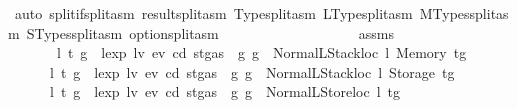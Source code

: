 \begin{isabellebody}
\ {\isacharparenleft}{\kern0pt}auto\ split{\isacharcolon}{\kern0pt}if{\isacharunderscore}{\kern0pt}split{\isacharunderscore}{\kern0pt}asm\ result{\isachardot}{\kern0pt}split{\isacharunderscore}{\kern0pt}asm\ Type{\isachardot}{\kern0pt}split{\isacharunderscore}{\kern0pt}asm\ LType{\isachardot}{\kern0pt}split{\isacharunderscore}{\kern0pt}asm\ MTypes{\isachardot}{\kern0pt}split{\isacharunderscore}{\kern0pt}asm\ STypes{\isachardot}{\kern0pt}split{\isacharunderscore}{\kern0pt}asm\ option{\isachardot}{\kern0pt}split{\isacharunderscore}{\kern0pt}asm{\isacharparenright}{\kern0pt}\isanewline
\ \ \ \ \isamarkupfalse%
\isanewline
\ \ \isamarkupfalse%
\isanewline
\ \ \ \ \isamarkupfalse%
\ {}\isanewline
\ \ \ \ \isamarkupfalse%
\ assms\ \isamarkupfalse%
\isanewline
\ \ \ \ \ \ {\isacharparenleft}{\kern0pt}{}{}{\isacharparenright}{\kern0pt}\ l\ t{\isacharprime}{\kern0pt}\ g{\isacharprime}{\kern0pt}\ \ {\isachardoublequoteopen}lexp\ lv\ ev\ cd\ {\isacharparenleft}{\kern0pt}st{\isasymlparr}gas\ {\isacharcolon}{\kern0pt}{\isacharequal}{\kern0pt}\ g{\isasymrparr}{\isacharparenright}{\kern0pt}\ g\ {\isacharequal}{\kern0pt}\ Normal{\isacharparenleft}{\kern0pt}{\isacharparenleft}{\kern0pt}LStackloc\ l{\isacharcomma}{\kern0pt}\ Memory\ t{\isacharprime}{\kern0pt}{\isacharparenright}{\kern0pt}{\isacharcomma}{\kern0pt}g{\isacharprime}{\kern0pt}{\isacharparenright}{\kern0pt}{\isachardoublequoteclose}\isanewline
\ \ \ \ {\isacharbar}{\kern0pt}\ {\isacharparenleft}{\kern0pt}{}{}{\isacharparenright}{\kern0pt}\ l\ t{\isacharprime}{\kern0pt}\ g{\isacharprime}{\kern0pt}\ \ {\isachardoublequoteopen}lexp\ lv\ ev\ cd\ {\isacharparenleft}{\kern0pt}st{\isasymlparr}gas\ {\isacharcolon}{\kern0pt}{\isacharequal}{\kern0pt}\ g{\isasymrparr}{\isacharparenright}{\kern0pt}\ g\ {\isacharequal}{\kern0pt}\ Normal{\isacharparenleft}{\kern0pt}{\isacharparenleft}{\kern0pt}LStackloc\ l{\isacharcomma}{\kern0pt}\ Storage\ t{\isacharprime}{\kern0pt}{\isacharparenright}{\kern0pt}{\isacharcomma}{\kern0pt}g{\isacharprime}{\kern0pt}{\isacharparenright}{\kern0pt}{\isachardoublequoteclose}\isanewline
\ \ \ \ {\isacharbar}{\kern0pt}\ {\isacharparenleft}{\kern0pt}{}{}{\isacharparenright}{\kern0pt}\ l\ t{\isacharprime}{\kern0pt}\ g{\isacharprime}{\kern0pt}\ \ {\isachardoublequoteopen}lexp\ lv\ ev\ cd\ {\isacharparenleft}{\kern0pt}st{\isasymlparr}gas\ {\isacharcolon}{\kern0pt}{\isacharequal}{\kern0pt}\ g{\isasymrparr}{\isacharparenright}{\kern0pt}\ g\ {\isacharequal}{\kern0pt}\ Normal{\isacharparenleft}{\kern0pt}{\isacharparenleft}{\kern0pt}LStoreloc\ l{\isacharcomma}{\kern0pt}\ t{\isacharprime}{\kern0pt}{\isacharparenright}{\kern0pt}{\isacharcomma}{\kern0pt}g{\isacharprime}{\kern0pt}{\isacharparenright}{\kern0pt}{\isachardoublequoteclose}\isanewline

\end{isabellebody}
